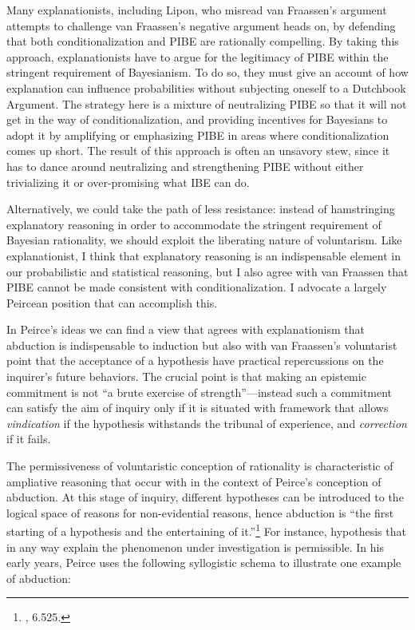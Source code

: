 Many explanationists, including Lipon, who misread van Fraassen's
argument attempts to challenge van Fraassen's negative argument heads
on, by defending that both conditionalization and PIBE are rationally
compelling. By taking this approach, explanationists have to argue for
the legitimacy of PIBE within the stringent requirement of Bayesianism.
To do so, they must give an account of how explanation can influence
probabilities without subjecting oneself to a Dutchbook Argument. The
strategy here is a mixture of neutralizing PIBE so that it will not get
in the way of conditionalization, and providing incentives for Bayesians
to adopt it by amplifying or emphasizing PIBE in areas where
conditionalization comes up short. The result of this approach is often
an unsavory stew, since it has to dance around neutralizing and
strengthening PIBE without either trivializing it or over-promising what
IBE can do.

Alternatively, we could take the path of less resistance: instead of
hamstringing explanatory reasoning in order to accommodate the stringent
requirement of Bayesian rationality, we should exploit the liberating
nature of voluntarism. Like explanationist, I think that explanatory
reasoning is an indispensable element in our probabilistic and
statistical reasoning, but I also agree with van Fraassen that PIBE
cannot be made consistent with conditionalization. I advocate a largely
Peircean position that can accomplish this.

In Peirce's ideas we can find a view that agrees with explanationism
that abduction is indispensable to induction but also with van
Fraassen's voluntarist point that the acceptance of a hypothesis have
practical repercussions on the inquirer's future behaviors. The crucial
point is that making an epistemic commitment is not ``a brute exercise
of strength''---instead such a commitment can satisfy the aim of inquiry
only if it is situated with framework that allows \emph{vindication} if
the hypothesis withstands the tribunal of experience, and
\emph{correction} if it fails.

The permissiveness of voluntaristic conception of rationality is
characteristic of ampliative reasoning that occur with in the context of
Peirce's conception of abduction. At this stage of inquiry, different
hypotheses can be introduced to the logical space of reasons for
non-evidential reasons, hence abduction is ``the first starting of a
hypothesis and the entertaining of it.''\footnote{\cite{CP}, 6.525.} For
instance, hypothesis that in any way explain the phenomenon under
investigation is permissible. In his early years, Peirce uses the
following syllogistic schema to illustrate one example of abduction:


